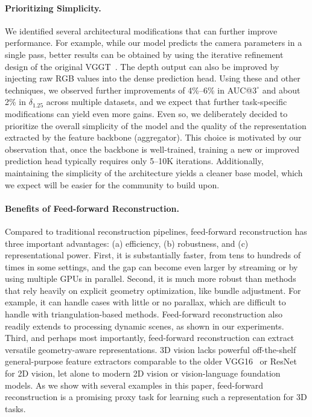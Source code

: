 \paragraph{Prioritizing Simplicity.}

We identified several architectural modifications that can further improve performance.
For example, while our model predicts the camera parameters in a single pass, better results can be obtained by using the iterative refinement design of the original VGGT~\cite{wang25vggt}.
The depth output can also be improved by injecting raw RGB values into the dense prediction head.
Using these and other techniques, we observed further improvements of 4\%--6\% in AUC@$3^\circ$ and about 2\% in \(\delta_{1.25}\) across multiple datasets, and we expect that further task-specific modifications can yield even more gains.
Even so, we deliberately decided to prioritize the overall simplicity of the model and the quality of the representation extracted by the feature backbone (aggregator). 
This choice is motivated by our observation that, once the backbone is well-trained, training a new or improved prediction head typically requires only 5--10K iterations.
Additionally, maintaining the simplicity of the architecture yields a cleaner base model, which we expect will be easier for the community to build upon.




\paragraph{Benefits of Feed-forward Reconstruction.}

Compared to traditional reconstruction pipelines, feed-forward reconstruction has three important advantages:
(a) efficiency,
(b) robustness, and
(c) representational power.
First, it is substantially faster, from tens to hundreds of times in some settings, and the gap can become even larger by streaming or by using multiple GPUs in parallel.
Second, it is much more robust than methods that rely heavily on explicit geometry optimization, like bundle adjustment.
For example, it can handle cases with little or no parallax, which are difficult to handle with triangulation-based methods.
Feed-forward reconstruction also readily extends to processing dynamic scenes, as shown in our experiments. 
Third, and perhaps most importantly, feed-forward reconstruction can extract versatile geometry-aware representations.
3D vision lacks powerful off-the-shelf general-purpose feature extractors comparable to the older VGG16~\cite{simonyan15very} or ResNet~\cite{he16deep} for 2D vision, let alone to modern 2D vision or vision-language foundation models.
As we show with several examples in this paper, feed-forward reconstruction is a promising proxy task for learning such a representation for 3D tasks.

